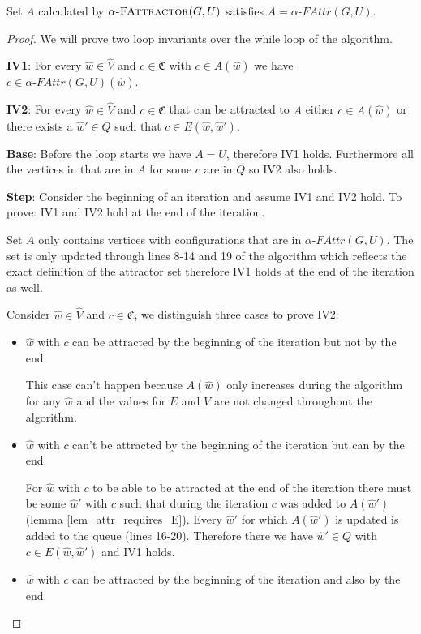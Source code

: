 \begin{theorem}
Set $A$ calculated by $\textsc{$\alpha$-FAttractor}(G,U)$ satisfies $A = \alpha\textit{-FAttr}(G,U)$.
	\begin{proof} We will prove two loop invariants over the while loop of the algorithm.
		
		\textbf{IV1}: For every $\hat{w} \in \hat{V}$ and $c \in \mathfrak{C}$ with $c \in A(\hat{w})$ we have $c \in \alpha\textit{-FAttr}(G,U)(\hat{w})$.
		
		\textbf{IV2}: For every $\hat{w} \in \hat{V}$ and $c \in \mathfrak{C}$ that can be attracted to $A$ either $c \in A(\hat{w})$ or there exists a $\hat{w}' \in Q$ such that $c \in E(\hat{w},\hat{w}')$.
		
		\textbf{Base}: Before the loop starts we have $A = U$, therefore IV1 holds. Furthermore all the vertices in that are in $A$ for some $c$ are in $Q$ so IV2 also holds.
		
		\textbf{Step}: Consider the beginning of an iteration and assume IV1 and IV2 hold. To prove: IV1 and IV2 hold at the end of the iteration.
		
		Set $A$ only contains vertices with configurations that are in $\alpha\textit{-FAttr}(G,U)$. The set is only updated through lines 8-14 and 19 of the algorithm which reflects the exact definition of the attractor set therefore IV1 holds at the end of the iteration as well.
		
		Consider $\hat{w} \in \hat{V}$ and $c \in \mathfrak{C}$, we distinguish three cases to prove IV2:
		\begin{itemize}
			\item $\hat{w}$ with $c$ can be attracted by the beginning of the iteration but not by the end.
			
			This case can't happen because $A(\hat{w})$ only increases during the algorithm for any $\hat{w}$ and the values for $E$ and $V$ are not changed throughout the algorithm.
			\item $\hat{w}$ with $c$ can't be attracted by the beginning of the iteration but can by the end.
			
			For $\hat{w}$ with $c$ to be able to be attracted at the end of the iteration there must be some $\hat{w}'$ with $c$ such that during the iteration $c$ was added to $A(\hat{w}')$ (lemma \ref{lem_attr_requires_E}). Every $\hat{w}'$ for which $A(\hat{w}')$ is updated is added to the queue (lines 16-20). Therefore there we have $\hat{w}' \in Q$ with $c \in E(\hat{w},\hat{w}')$ and IV1 holds.
			\item $\hat{w}$ with $c$ can be attracted by the beginning of the iteration and also by the end.
			

\end{itemize}
\end{proof}
\end{theorem}
